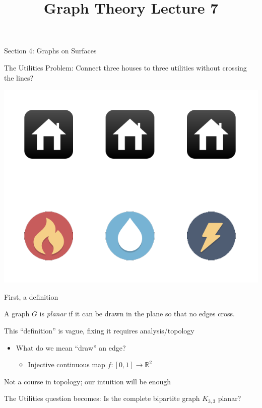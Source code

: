 \documentclass{beamer}
\title{Graph Theory Lecture 7}
\begin{document}
\begin{frame}{Section 4: Graphs on Surfaces}
  \begin{block}{The Utilities Problem:}
  Connect three houses to three utilities without crossing the lines?
\begin{center}
  \includegraphics[width=.8\textwidth]{Pictures/utilities.png}
\end{center}
  \end{block}
 
 \end{frame} 


\begin{frame}{First, a definition}
  \begin{definition}A graph $G$ is \emph{planar} if it can be drawn in the plane so that no edges cross.
  \end{definition}

  \begin{block}{This ``definition'' is vague, fixing it requires analysis/topology}
    \begin{itemize}
    \item What do we mean ``draw'' an edge? 
      \begin{itemize}
        \item Injective continuous map $f:[0,1]\to\mathbb{R}^2$
        \end{itemize}
      \end{itemize}
    \end{block}
  \begin{block}{Not a course in topology; our intuition will be enough}
    \end{block}

  
  
\begin{block}{The Utilities question becomes:} Is the complete bipartite graph $K_{3,3}$ planar?
\end{block}
  


  \end{frame}
\end{document}
